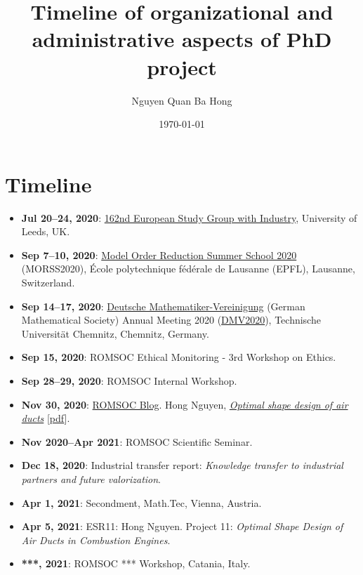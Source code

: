 \documentclass[onsided]{article}
\title{Timeline of organizational and administrative aspects of PhD project}
\author{Nguyen Quan Ba Hong}
\date{\today}
\numberwithin{equation}{section}
\begin{document}
\maketitle
\setcounter{secnumdepth}{6}
\setcounter{tocdepth}{6}
\tableofcontents


\section{Timeline}
\begin{itemize}
    \item \textbf{Jul 20--24, 2020}: \href{https://conferences.leeds.ac.uk/lesgi/}{162nd European Study Group with Industry}, University of Leeds, UK.
    \item \textbf{Sep 7--10, 2020}: \href{https://morss2020.epfl.ch/}{Model Order Reduction Summer School 2020} (MORSS2020), \'Ecole polytechnique f\'ed\'erale de Lausanne (EPFL), Lausanne, Switzerland.
    \item \textbf{Sep 14--17, 2020}: \href{https://www.mathematik.de/}{Deutsche Mathematiker-Vereinigung} (German Mathematical Society) Annual Meeting 2020 (\href{https://www.tu-chemnitz.de/mathematik/dmv2020/index.php}{DMV2020}), Technische Universit\"at Chemnitz, Chemnitz, Germany.
    \item \textbf{Sep 15, 2020}: ROMSOC Ethical Monitoring - 3rd Workshop on Ethics.
    \item \textbf{Sep 28--29, 2020}: ROMSOC Internal Workshop.
    \item \textbf{Nov 30, 2020}: \href{https://www.romsoc.eu/blog/}{ROMSOC Blog}. Hong Nguyen, \href{https://www.romsoc.eu/optimal-shape-design-of-air-ducts/}{\textit{Optimal shape design of air ducts}} [\href{https://github.com/NQBH/miscellaneous/blob/master/ROMSOC/blog/optimal_shape_design_of_airducts/blog.pdf}{pdf}].
    \item \textbf{Nov 2020--Apr 2021}: ROMSOC Scientific Seminar.
    \item \textbf{Dec 18, 2020}: Industrial transfer report: \textit{Knowledge transfer to industrial partners and future valorization}.
    \item \textbf{Apr 1, 2021}: Secondment, Math.Tec, Vienna, Austria.
    \item \textbf{Apr 5, 2021}: ESR11: Hong Nguyen. Project 11: \textit{Optimal Shape Design of Air Ducts in Combustion Engines}.
    \item \textbf{***, 2021}: ROMSOC *** Workshop, Catania, Italy.
\end{itemize}
\end{document}
